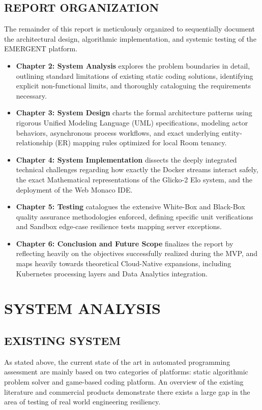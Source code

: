 \documentclass[12pt,a4paper]{report}
\begin{document}
\section{REPORT ORGANIZATION}
The remainder of this report is meticulously organized to sequentially document the architectural design, algorithmic implementation, and systemic testing of the EMERGENT platform.
\begin{itemize}
    \item \textbf{Chapter 2: System Analysis} explores the problem boundaries in detail, outlining standard limitations of existing static coding solutions, identifying explicit non-functional limits, and thoroughly cataloguing the requirements necessary.
    \item \textbf{Chapter 3: System Design} charts the formal architecture patterns using rigorous Unified Modeling Language (UML) specifications, modeling actor behaviors, asynchronous process workflows, and exact underlying entity-relationship (ER) mapping rules optimized for local Room tenancy.
    \item \textbf{Chapter 4: System Implementation} dissects the deeply integrated technical challenges regarding how exactly the Docker streams interact safely, the exact Mathematical representations of the Glicko-2 Elo system, and the deployment of the Web Monaco IDE.
    \item \textbf{Chapter 5: Testing} catalogues the extensive White-Box and Black-Box quality assurance methodologies enforced, defining specific unit verifications and Sandbox edge-case resilience tests mapping server exceptions.
    \item \textbf{Chapter 6: Conclusion and Future Scope} finalizes the report by reflecting heavily on the objectives successfully realized during the MVP, and maps heavily towards theoretical Cloud-Native expansions, including Kubernetes processing layers and Data Analytics integration.
\end{itemize}


\chapter{SYSTEM ANALYSIS}

\section {EXISTING SYSTEM} 
As stated above, the current state of the art in automated programming assessment are mainly based on two categories of platforms: static algorithmic problem solver and game-based coding platform. An overview of the existing literature and commercial products demonstrate there exists a large gap in the area of testing of real world engineering resiliency.
\end{document}
